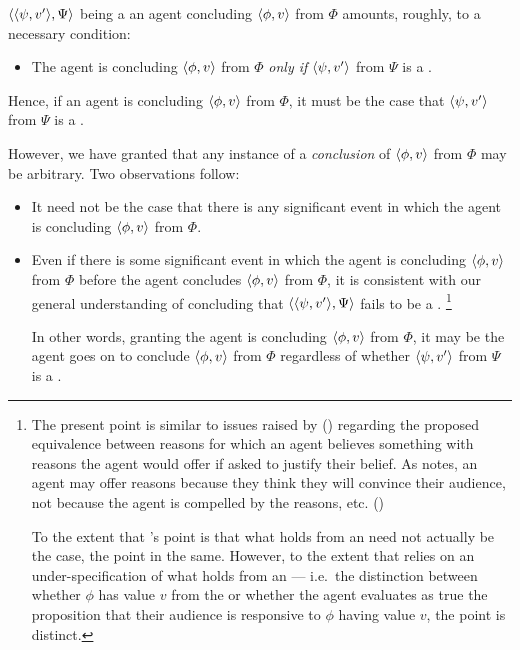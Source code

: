 \begin{note}
  \(\langle \langle \psi, v' \rangle, \Psi \rangle\) being a  an agent concluding \(\langle \phi, v \rangle\) from \(\Phi\) amounts, roughly, to a necessary condition:
  \begin{itemize}
  \item
    The agent is concluding \(\langle \phi, v \rangle\) from \(\Phi\) \emph{only if} \(\langle \psi, v' \rangle\) from \(\Psi\) is a \fc{}.
  \end{itemize}

  Hence, if an agent is concluding \(\langle \phi, v \rangle\) from \(\Phi\), it must be the case that \(\langle \psi, v' \rangle\) from \(\Psi\) is a \fc{}.

  However, we have granted that any instance of a \emph{conclusion} of \(\langle \phi, v \rangle\) from \(\Phi\) may be arbitrary.
  Two observations follow:

  \begin{itemize}
  \item
    It need not be the case that there is any significant event in which the agent is concluding \(\langle \phi, v \rangle\) from \(\Phi\).

  \item
    Even if there is some significant event in which the agent is concluding \(\langle \phi, v \rangle\) from \(\Phi\) before the agent concludes \(\langle \phi, v \rangle\) from \(\Phi\), it is consistent with our general understanding of concluding that \(\langle \langle \psi, v' \rangle, \Psi \rangle\) fails to be a \requ{}.%
    \footnote{
      The present point is similar to issues raised by \citeauthor{Harman:1973ww} (\citeyear{Harman:1973ww}) regarding the proposed equivalence between reasons for which an agent believes something with reasons the agent would offer if asked to justify their belief.
      As \citeauthor{Harman:1973ww} notes, an agent may offer reasons because they think they will convince their audience, not because the agent is compelled by the reasons, etc.
      (\citeyear[Ch.2]{Harman:1973ww})

      To the extent that \citeauthor{Harman:1973ww}'s point is that what holds from an \agpe{} need not actually be the case, the point in the same.
      However, to the extent that \citeauthor{Harman:1973ww} relies on an under-specification of what holds from an \agpe{} --- i.e.\ the distinction between whether \(\phi\) has value \(v\) from the \agpe{} or whether the agent evaluates as true the proposition that their audience is responsive to \(\phi\) having value \(v\), the point is distinct.
    }

    In other words, granting the agent is concluding \(\langle \phi, v \rangle\) from \(\Phi\), it may be the agent goes on to conclude \(\langle \phi, v \rangle\) from \(\Phi\) regardless of whether \(\langle \psi, v' \rangle\) from \(\Psi\) is a \fc{}.
  \end{itemize}


\end{note}
